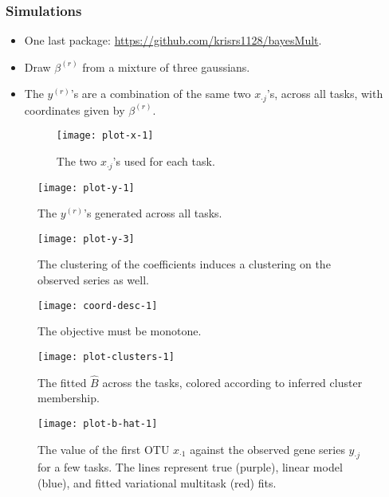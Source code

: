 \documentclass[10pt]{beamer}\usepackage[]{graphicx}\usepackage[]{color}
\begin{document}
\begin{frame}
  \frametitle{Simulations}
  \begin{itemize}
  \item One last package: \url{https://github.com/krisrs1128/bayesMult}.
  \item Draw $\beta^{(r)}$ from a mixture of three gaussians.
  \item The $y^{(r)}$'s are a combination of the same two $x_{\cdot j}$'s, across all tasks, with
    coordinates given by $\beta^{(r)}$.
    \begin{figure}
      \texttt{[image: plot-x-1]}
      \caption{The two $x_{\cdot j}$'s used for each task.}
    \end{figure}
  \end{itemize}
\end{frame}
\begin{frame}
  \begin{figure}
    \texttt{[image: plot-y-1]}
    \caption{The $y^{(r)}$'s generated across all tasks.}
  \end{figure}
\end{frame}
\begin{frame}
  \begin{figure}
    \texttt{[image: plot-y-3]}
    \caption{The clustering of the coefficients induces a clustering on the observed series as well.}
  \end{figure}
\end{frame}

\begin{frame}
  \begin{figure}
    \texttt{[image: coord-desc-1]}
    \caption{The objective must be monotone.}
  \end{figure}
\end{frame}
\begin{frame}
\begin{figure}
  \texttt{[image: plot-clusters-1]}
  \caption{The fitted $\hat{B}$ across the tasks, colored according to inferred
    cluster membership.}
\end{figure}
\end{frame}
\begin{frame}
\begin{figure}
  \texttt{[image: plot-b-hat-1]}
  \caption{The value of the first OTU $x_{\cdot 1}$ against the observed gene series $y_{\cdot j}$ for a few tasks.
    The lines represent true (purple), linear model (blue),
    and fitted variational multitask (red) fits.}
\end{figure}
\end{frame}
\end{document}
